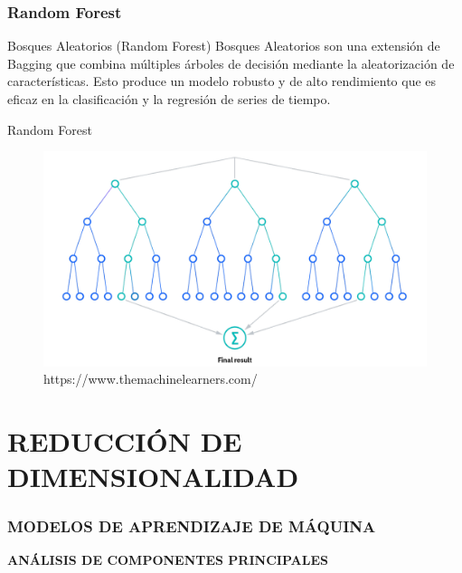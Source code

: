\documentclass{beamer}
\begin{document}
\begin{frame}

  \frametitle{Random Forest}
  \begin{block}{Bosques Aleatorios (Random Forest)}
        Bosques Aleatorios son una extensión de Bagging que combina múltiples árboles de decisión mediante la aleatorización de características. Esto produce un modelo robusto y de alto rendimiento que es eficaz en la clasificación y la regresión de series de tiempo.
  \end{block}
\end{frame}

\begin{frame}
	\begin{block}{Random Forest}
		\begin{figure}
			\includegraphics[scale=0.2]{RandomForest.png}
			\caption{https://www.themachinelearners.com/}
		\end{figure}
	\end{block}
\end{frame}


\section{REDUCCIÓN DE DIMENSIONALIDAD}

\begin{frame}
	\frametitle{MODELOS DE APRENDIZAJE DE MÁQUINA}
	\begin{block}{}	
		\center
		\textbf{ANÁLISIS DE COMPONENTES PRINCIPALES}
	\end{block}
\end{frame}
\end{document}
